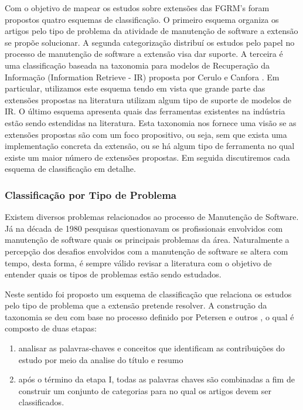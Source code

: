 \documentclass[msc]{ppgccufmg} %
\begin{document}
Com o objetivo de mapear os estudos sobre extensões das FGRM's foram propostos quatro esquemas de classificação. O primeiro esquema organiza os artigos pelo tipo de problema da atividade de manutenção de software a extensão se propõe solucionar. A segunda categorização distribuí os estudos pelo papel no processo de manutenção de software a extensão visa dar suporte. A terceira é uma classificação baseada na taxonomia para modelos de Recuperação da Informação (Information Retrieve - IR) proposta por Cerulo e Canfora \cite{cerulo2004taxonomy}. Em particular, utilizamos este esquema tendo em vista que grande parte das extensões propostas na literatura utilizam algum tipo de suporte de modelos de IR. O último esquema apresenta quais das ferramentas existentes na indústria estão sendo estendidas na literatura. Esta taxonomia nos fornece uma visão se as extensões propostas são com um foco propositivo, ou seja, sem que exista uma implementação concreta da extensão, ou se há algum tipo de ferramenta no qual existe um maior número de extensões propostas. Em seguida discutiremos cada esquema de classificação em detalhe.

\subsubsection{Classificação por Tipo de Problema}
\label{subsubsec:map-esquema-suporte-problema}

Existem diversos problemas relacionados ao processo de Manutenção de Software. Já na década de
1980 pesquisas questionavam os profissionais envolvidos com manutenção de software quais os principais
problemas da área\cite{Lientz:1981:PAS:358790.358796}. Naturalmente a percepção dos desafios
envolvidos com a manutenção de software se altera com tempo, desta forma, é sempre válido
revisar a literatura com o objetivo de entender quais os tipos de problemas estão sendo estudados.

Neste sentido foi proposto um esquema de classificação que relaciona os estudos pelo tipo de
problema que a extensão pretende resolver. A construção da taxonomia se deu com base no processo
definido por Petersen e outros \cite{Petersen2008}, o qual é composto de duas etapas:

\begin{enumerate}[I] 
	\item analisar as palavras-chaves e conceitos que identificam as contribuições do estudo por meio da analise do título e resumo
	\item após o término da etapa I, todas as palavras chaves são combinadas a fim de construir um conjunto de categorias para no qual os artigos devem ser classificados.
\end{enumerate} 
\end{document}
